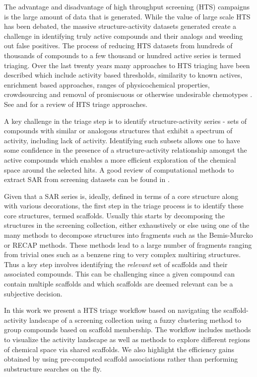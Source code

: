 \documentclass[journal=jacsat,manuscript=article]{achemso}
\begin{document}
The advantage and disadvantage of high throughput screening (HTS)
campaigns is the large amount of data that is generated. While the
value of large scale HTS has been debated\cite{Macarron:2011qv}, the
massive structure-activity datasets generated create a challenge in
identifying truly active compounds and their analogs and weeding out
false positives. The process of reducing HTS datasets from hundreds of
thousands of compounds to a few thousand or hundred active series is
termed triaging. Over the last twenty years many approaches to HTS
triaging have been described which include activity based
thresholds\cite{Mulrooney:2013aa}, similarity to known
actives\cite{Shanmugasundaram:2005aa}, enrichment based
approaches\cite{Varin2010CSE,Pu:2012wf}, ranges of physicochemical
properties\cite{Cox:2012qy}, crowdsourcing\cite{Peng:2013qp} and
removal of promiscuous or otherwise undesirable chemotypes
\cite{Dahlin:2014fp}. See \citeauthor{Shun:2011sy} and
\citeauthor{Langer:2009mw} for a review of HTS triage approaches.

A key challenge in the triage step is to identify structure-activity
series - sets of compounds with similar or analogous structures that exhibit a
spectrum of activity, including lack of activity. Identifying such subsets allows one to have some
confidence in the presence of a structure-activity relationship amongst the
active compounds which enables a more efficient exploration of the chemical
space around the selected hits. A good review of computational methods to extract SAR from screening datasets can be found in \citeauthor{Wawer2010review}. 

Given that a SAR series is, ideally, defined in terms of a core structure along
with various decorations, the first step in the triage process is to
identify these core structures, termed scaffolds. Usually this starts by
decomposing the structures in the screening collection, either exhaustively or
else using one of the many methods to decompose structures into fragments such
as the Bemis-Murcko\cite{BemisMurcko1999,BemisMurcko1996} or RECAP
methods\cite{Lewell:1998aa}. These methods lead to a large number of
fragments ranging from trivial ones such as a benzene ring to very complex
multiring structures. Thus a key step involves identifying the \emph{relevant} set of
scaffolds and their associated compounds. This can be challenging since a given
compound can contain multiple scaffolds and which scaffolds are
deemed relevant can be a subjective decision\cite{Hu:2016aa}.

In this work we present a HTS triage workflow based on navigating the
scaffold-activity landscape of a screening collection using a fuzzy
clustering method to group compounds based on scaffold membership. The
workflow includes methods to visualize the activity landscape as well
as methods to explore different regions of chemical space via shared
scaffolds. We also highlight the efficiency gains obtained by using
pre-computed scaffold associations rather than performing substructure
searches on the fly.
\end{document}
